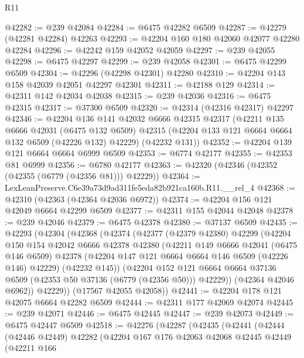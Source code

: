 \begin{lexlean}{R11}
\begin{coremodule}
@42282 := @239 @42084
@42284 := @6475 @42282 @6509
@42287 := @42279 (@42281 @42284) @42263
@42293 := @42204 @160 @180 @42060 @42077 @42280 @42284
@42296 := @42242 @159 @42052 @42059
@42297 := @239 @42055
@42298 := @6475 @42297
@42299 := @239 @42058
@42301 := @6475 @42299 @6509
@42304 := @42296 (@42298 @42301) @42280
@42310 := @42204 @143 @158 @42039 @42051 @42297 @42301
@42311 := @42188 @129
@42314 := @42311 @142 @42034 @42038
@42315 := @239 @42036
@42316 := @6475 @42315
@42317 := @37300 @6509
@42320 := @42314 (@42316 @42317) @42297
@42346 := @42204
    @136
    @141
    @42032
    @6666
    @42315
    @42317
    (@42211
      @135
      @6666
      @42031
      (@6475 @132 @6509)
      @42315
      (@42204 @133 @121 @6664 @6664 @132 @6509 (@42226 @132) @42229)
      (@42232 @131))
@42352 := @42204 @139 @121 @6664 @6664 @6999 @6509
@42353 := @6774 @42177
@42355 := @42353 @81 @6999
@42356 := @6780 @42177
@42363 := @42320 (@42346 (@42352 (@42355 (@6779 (@42356 @81))) @42229))
@42364 := LexLeanPreserve.C6e39a73d9ad311fe5eda82b921ca160b.R11.__rel_4
@42368 := @42310 (@42363 (@42364 @42036 @6972))
@42374 := @42204 @156 @121 @42049 @6664 @42299 @6509
@42377 := @42311 @155 @42044 @42048
@42378 := @239 @42046
@42379 := @6475 @42378
@42380 := @37137 @6509
@42435 := @42293
    (@42304
      (@42368
        (@42374
          (@42377
            (@42379 @42380)
            @42299
            (@42204
              @150
              @154
              @42042
              @6666
              @42378
              @42380
              (@42211
                @149
                @6666
                @42041
                (@6475 @146 @6509)
                @42378
                (@42204 @147 @121 @6664 @6664 @146 @6509 (@42226 @146) @42229)
                (@42232 @145))
              (@42204
                @152
                @121
                @6664
                @6664
                @37136
                @6509
                (@42353 @50 @37136 (@6779 (@42356 @50)))
                @42229))
            (@42364 @42046 @6962))
          @42229))
      (@17567 @42055 @42058))
@42441 := @42204 @178 @121 @42075 @6664 @42282 @6509
@42444 := @42311 @177 @42069 @42074
@42445 := @239 @42071
@42446 := @6475 @42445
@42447 := @239 @42073
@42449 := @6475 @42447 @6509
@42518 := @42276
    (@42287
      (@42435
        (@42441
          (@42444
            (@42446 @42449)
            @42282
            (@42204
              @167
              @176
              @42063
              @42068
              @42445
              @42449
              (@42211
                @166

\end{coremodule}
\end{lexlean}
